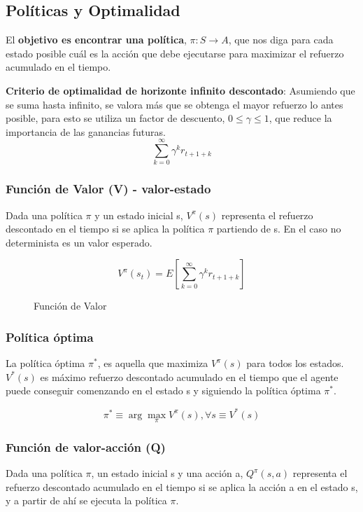 \documentclass[12pt, twoside, openright]{report} %
\begin{document}
\subsection{Políticas y Optimalidad}

El \textbf{objetivo es encontrar una política}, $\pi: S \rightarrow A$, que nos diga para cada estado posible cuál es la acción que debe ejecutarse para maximizar el refuerzo acumulado en el tiempo.

\textbf{Criterio de optimalidad de horizonte infinito descontado}: Asumiendo que se suma hasta infinito, se valora más que se obtenga el mayor refuerzo lo antes posible, para esto se utiliza un factor de descuento, $0 \leq \gamma \leq 1$, que reduce la importancia de las ganancias futuras.
$$\sum ^\infty _{k=0} \gamma^k r_{t+1+k}$$

\pagebreak

\subsubsection{Función de Valor (V) - valor-estado}
Dada una política $\pi$ y un estado inicial s, $V^\pi (s)$ representa el refuerzo descontado en el tiempo si se aplica la política $\pi$ partiendo de s. En el caso no determinista es un valor esperado.

\begin{figure}[H]
	$$V^\pi(s_t)=E \left[ \sum ^\infty _{k=0} \gamma^k r_{t+1+k} \right]$$
	\captionsetup{justification=centering}
	\caption{Función de Valor}
\end{figure}

\subsubsection{Política óptima}
La política óptima $\pi^*$, es aquella que maximiza $V^\pi (s)$ para todos los estados. $V^* (s)$ es máximo refuerzo descontado acumulado en el tiempo que el agente puede conseguir comenzando en el estado s y siguiendo la política óptima $\pi^*$.

$$\pi ^* \equiv \arg \max_\pi V^\pi (s), \forall s \equiv V^* (s)$$


\subsubsection{Función de valor-acción (Q)}
Dada una política $\pi$, un estado inicial s y una acción a, $Q^\pi (s, a)$ representa el refuerzo descontado acumulado en el tiempo si se aplica la acción a en el estado s, y a partir de ahí se ejecuta la política $\pi$.
\end{document}
